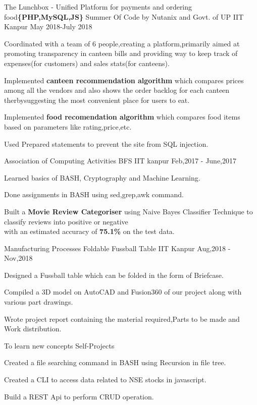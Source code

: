 
\begin{cventries}

  \cventry
  {The Lunchbox - Unified Platform for payments and ordering food\textbf{\{PHP,MySQL,JS\}}}
  {Summer Of Code by Nutanix and Govt. of UP}
  {IIT Kanpur}
  {May 2018-July 2018}
  {
    \begin{cvitems}
     \item Coordinated with a team of 6 people,creating a platform,primarily aimed at promoting transparency in canteen bills and providing way to keep track of expenses(for customers) and sales stats(for canteens). 
     \item Implemented \textbf{canteen recommendation algorithm} which compares prices among all the vendors and also shows the order backlog for each canteen therbysuggesting the most convenient place for users to eat. 
     \item Implemented \textbf{food recomendation algorithm} which compares food items based on parameters like rating,price,etc.
     \item Used Prepared statements to prevent the site from SQL injection.
    \end{cvitems}
  }
  \cventry
  {Association of Computing Activities}
  {BFS}
  {IIT kanpur}
  {Feb,2017 - June,2017}
  {
     \begin{cvitems}
      \item Learned basics of BASH, Cryptography and Machine Learning.
      \item Done assignments in BASH using sed,grep,awk command.
      \item Built a \textbf{Movie Review Categoriser} using Naive Bayes Classifier Technique
            to classify reviews into positive or negative\\ with an estimated accuracy of \textbf{75.1\%} on the test data.
     \end{cvitems}
  }
  \cventry 
  {Manufacturing Processes}
  {Foldable Fussball Table}
  {IIT Kanpur}
  {Aug,2018 - Nov,2018}
  {
    \begin{cvitems}
      \item Designed a Fussball table which can be folded in the form of Briefcase.
      \item Compiled a 3D model on AutoCAD and Fusion360 of our project along with various part drawings.
      \item Wrote project report containing the material required,Parts to be made and Work distribution.
    \end{cvitems}
  }
  \cventry
  {To learn new concepts}
  {Self-Projects}
  {}
  {}
  {
    \begin{cvitems}
      \item Created a file searching command in BASH using Recursion in file tree.
      \item Created a CLI to access data related to NSE stocks in javascript.
      \item Build a REST Api to perform CRUD operation.
    \end{cvitems}
  }
\end{cventries}

